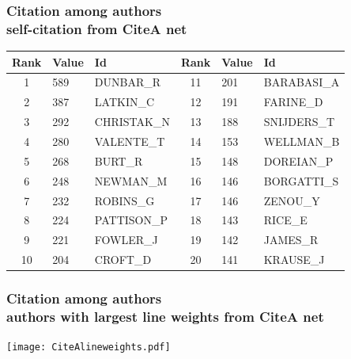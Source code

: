 \documentclass[hyperref={pdfstartview={FitBH -32768},
                         pdfpagemode=FullScreen,
                         plainpages=false,
                         colorlinks=true}
              ]{beamer}
\begin{document}
\begin{frame}[fragile]
\frametitle{Citation among authors \\ \normalsize self-citation from CiteA net}

\renewcommand{\arraystretch}{0.95}
\footnotesize
\begin{center}
\begin{tabular}{c|l|l|c|l|l|} 
     Rank  &     Value  & Id		 &    Rank  &     Value  & Id	   \\  \hline  
        1  &  589  & DUNBAR\_R	&    11  &  201  & BARABASI\_A	   \\
        2  &  387  & LATKIN\_C	&    12  &  191  & FARINE\_D	   \\
        3  &  292  & CHRISTAK\_N	&    13  &  188  & SNIJDERS\_T	   \\
        4  &  280  & VALENTE\_T	&    14  &  153  & WELLMAN\_B	   \\
        5  &  268  & BURT\_R	      	&    15  &  148  & DOREIAN\_P	   \\
        6  &  248  & NEWMAN\_M	&    16  &  146  & BORGATTI\_S	   \\
        7  &  232  & ROBINS\_G	&    17  &  146  & ZENOU\_Y	   \\    
        8  &  224  & PATTISON\_P	&    18  &  143  & RICE\_E	   \\    
        9  &  221  & FOWLER\_J	&    19  &  142  & JAMES\_R	   \\    
       10  &  204  & CROFT\_D	      	&   20   & 141   & KRAUSE\_J	    \\ \hline 
\end{tabular} 
\end{center}

\end{frame}

\begin{frame}[fragile]
\frametitle{Citation among authors \\ \normalsize authors with largest line weights from CiteA net}

\begin{center}
\texttt{[image: CiteAlineweights.pdf]}
\end{center}

\end{frame}
\end{document}
